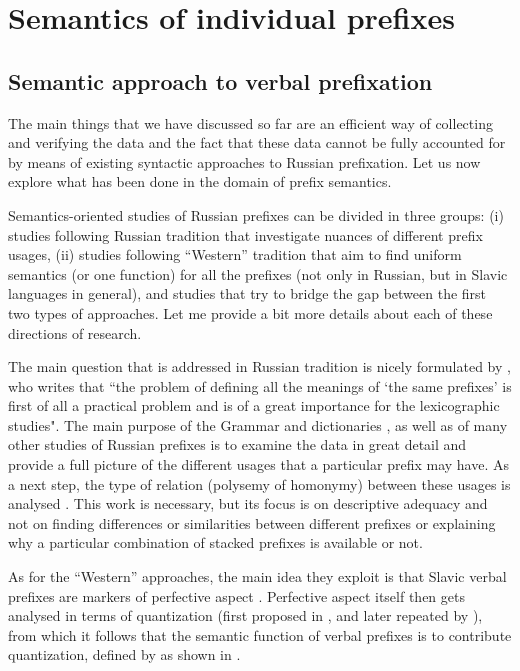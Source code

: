 \chapter{Semantics of individual prefixes} %
\label{Chapter5}
\section{Semantic approach to verbal prefixation}
The main things that we have discussed so far are an efficient way of collecting and verifying the data and the fact that these data cannot be fully accounted for by means of existing syntactic approaches to Russian prefixation. Let us now explore what has been done in the domain of prefix semantics.

Semantics-oriented studies of Russian prefixes can be divided in three groups: (i) studies following Russian tradition that investigate nuances of different prefix usages, (ii) studies following ``Western'' tradition that aim to find uniform semantics (or one function) for all the prefixes (not only in Russian, but in Slavic languages in general), and studies that try to bridge the gap between the first two types of approaches. Let me provide a bit more details about each of these directions of research.

The main question that is addressed in Russian tradition is nicely formulated by \citet[18]{Boguslawski:63}, who writes that ``the problem of defining all the meanings of `the same prefixes' is first of all a practical problem and is of a great importance for the lexicographic studies". The main purpose of the Grammar \citep{Grammar:52, Shvedova:82} and dictionaries \citep{Dict:50, Dict:57}, as well as of many other studies of Russian prefixes \citep[][among others]{Avilova:64, Golovin:59, Lopatin:97, Tixonov:98} is to examine the data in great detail and provide a full picture of the different usages that a particular prefix may have. As a next step, the type of relation (polysemy of homonymy) between these usages is analysed \citep{Krongauz:97, Plungyan:01}. This work is necessary, but its focus is on descriptive adequacy and not on finding differences or similarities between different prefixes or explaining why a particular combination of stacked prefixes is available or not.

As for the ``Western'' approaches, the main idea they exploit is that Slavic verbal prefixes are markers of perfective aspect \citep[see, e.g.,][among others]{Binnick:91, Krifka:92, Zucchi:99}. Perfective aspect itself then gets analysed in terms of quantization (first proposed in \citealt{Krifka:86, Krifka:92}, and later repeated by \citealt{Pinon:95}), from which it follows that the semantic function of verbal prefixes is to contribute quantization, defined by \citet{Krifka:86} as shown in . 

